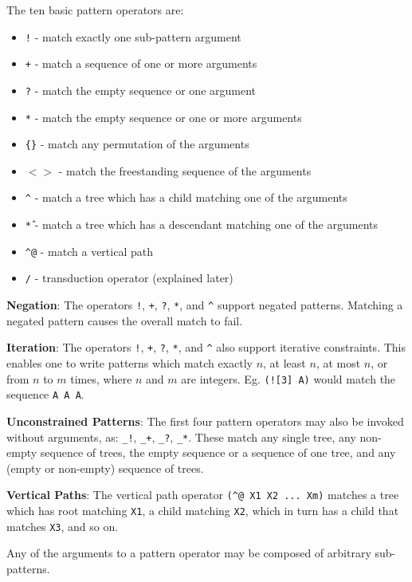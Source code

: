 \documentclass[11pt]{article}
\begin{document}
The ten basic pattern operators are:
\begin {itemize}
\item  \texttt{!}   - match exactly one sub-pattern argument
\item  \texttt{+}   - match a sequence of one or more arguments
\item  \texttt{?}   - match the empty sequence or one argument
\item  \texttt{*}   - match the empty sequence or one or more arguments
\item  \texttt{\{\}}  - match any permutation of the arguments
\item  \texttt{$<>$}  - match the freestanding sequence of the arguments
\item  \texttt{\^}    - match a tree which has a child matching one of the arguments   
\item  \texttt{\^*}    - match a tree which has a descendant matching one of the arguments \item  \texttt{\^{}@}   - match a vertical path 
\item  \texttt{/}   - transduction operator (explained later)
\end {itemize}

{\bf Negation}: 
The operators \texttt{!}, \texttt{+}, \texttt{?}, \texttt{*}, and \texttt{\^} support negated patterns.  Matching a negated pattern causes the overall match to fail.

{\bf Iteration}:
The operators \texttt{!}, \texttt{+}, \texttt{?}, \texttt{*}, and \texttt{\^} also support iterative constraints.   This enables one to write patterns which match exactly $n$, at least $n$, at most $n$, or from $n$ to $m$ times, where $n$ and $m$ are integers.   Eg. \texttt{(![3] A)} would match the sequence \texttt{A A A}.

{\bf Unconstrained Patterns}:
The first four pattern operators may also be invoked without arguments, as: \texttt{\_!}, \texttt{\_+}, \texttt{\_?}, \texttt{\_*}.  These match any single tree, any non-empty sequence of trees, the empty sequence or a sequence of one tree, and any (empty or non-empty) sequence of trees.   

{\bf Vertical Paths}:
The vertical path operator  \texttt{(\^{}@ X1 X2 ... Xm)}  matches a tree which has root matching \texttt{X1}, a child matching \texttt{X2}, which in turn has a child that matches \texttt{X3}, and so on. 

Any of the arguments to a pattern operator may be composed of arbitrary sub-patterns.   
\end{document}
